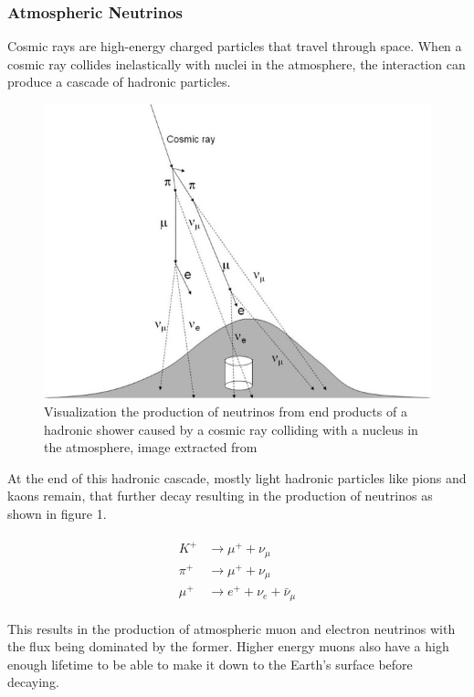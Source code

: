 \documentclass[a4paper,12pt,numbered]{article}
\begin{document}
\subsubsection{Atmospheric Neutrinos}

Cosmic rays are high-energy charged particles that travel through space. 
When a cosmic ray collides inelastically with nuclei in the atmosphere, the interaction can produce a cascade of hadronic particles.

\begin{figure}[H]
\includegraphics[width=\textwidth]{Neutrino_Figures/cosmic_ray.jpg}
\caption{Visualization the production of neutrinos from end products of a hadronic shower caused by a cosmic ray colliding with a nucleus in the atmosphere, image extracted from \cite{cosmicray_image_source}}
\end{figure}

At the end of this hadronic cascade, mostly light hadronic particles like pions and kaons remain, that further decay resulting in the production of neutrinos as shown in figure 1. 

\begin{align*}
\begin{split}
K^+ &\to \mu^+ + \nu_\mu
\\
\pi^+ &\to \mu^+ + \nu_\mu
\\
\mu^+ &\to e^+ + \nu_e + \bar{\nu}_\mu
\end{split}
\end{align*}

This results in the production of atmospheric muon and electron neutrinos with the flux being dominated by the former. Higher energy muons also have a high enough lifetime to be able to make it down to the Earth's surface before decaying.
\end{document}

